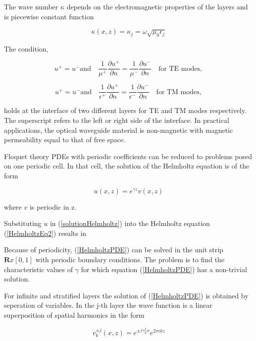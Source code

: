 The wave number $\kappa$ depends on the electromagnetic properties of
the layers and is piecewise constant function

\begin{equation}
\kappa(x,z) = \kappa_j = \omega \sqrt{\mu_0 \epsilon_j}
\end{equation}

The condition, 

\begin{equation}
u^+ = u^- \textrm{and} \quad \frac{1}{\mu^+}\frac{\partial{u^+}}{\partial{n}} =
\frac{1}{\mu^-}\frac{\partial{u^-}}{\partial{n}} \quad \textrm{for TE modes},
\end{equation}

\begin{equation}
u^+ = u^- \textrm{and} \quad \frac{1}{\epsilon^+}\frac{\partial{u^+}}{\partial{n}} =
\frac{1}{\epsilon^-}\frac{\partial{u^-}}{\partial{n}} \quad \textrm{for TM modes},
\end{equation}

holds at the interface of two different layers for TE and TM modes
respectively. The superscript refers to the left or right side of the
interface. In practical applications, the optical waveguide material
is non-magnetic with magnetic permeability equal to that of free
space.

Floquet theory PDEs with periodic coefficients can be reduced to
problems posed on one periodic cell. In that cell, the solution of the
Helmholtz equation is of the form

\begin{equation}
u(x,z) = e^{\gamma z} v(x,z)
\label{solutionHelmholtz}
\end{equation}

where $v$ is periodic in z.

Substituting $u$ in (\ref{solutionHelmholtz}) into the Helmholtz
equation (\ref{HelmholtzEq2}) results in

Because of periodicity, (\ref{HelmholtzPDE}) can be solved in the unit
strip $\mathbf{R} x [0,1]$ with periodic boundary conditions. The
problem is to find the characteristic values of $\gamma$ for which
equation (\ref{HelmholtzPDE}) has a non-trivial solution.

For infinite and stratified layers the solution of
(\ref{HelmholtzPDE}) is obtained by seperation of variables. In the
j-th layer the wave function is a linear superposition of spatial
harmonics in the form

\begin{equation}
v_k^{\pm j}(x,z) = e^{\pm i \gamma_k^j x} e^{2 \pi ikz}
\label{wavefun}
\end{equation}

